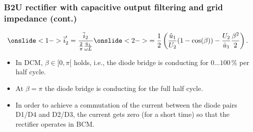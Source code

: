 \begin{frame}
    \frametitle{B2U rectifier with capacitive output filtering and grid impedance (cont.)}
    \begin{equation}
        \onslide<1->{\overline{i}'_2 = \frac{\overline{i}_2}{\frac{2}{\pi}\frac{\hat{u}_1}{\omega L}}} \onslide<2->{= \frac{1}{2} \left(\frac{\hat{u}_1}{U_2}(1-\cos(\beta))-\frac{U_2}{\hat{u}_1}\frac{\beta^2}{2}\right).}
        \label{eq:i2_avg_norm_B2U_cap_filt_grid_DCM}
    \end{equation}

    \begin{itemize}
        \item<3-> In DCM, $\beta \in [0, \pi[$ holds, i.e., the diode bridge is conducting for $0\ldots100 \,\%$ per half cycle.
        \item<4-> At $\beta = \pi$ the diode bridge is conducting for the full half cycle.
        \item<5-> In order to achieve a commutation of the current between the diode pairs D1/D4 and D2/D3, the current gets zero (for a short time) so that the rectifier operates in BCM. 
    \end{itemize}
\end{frame}

